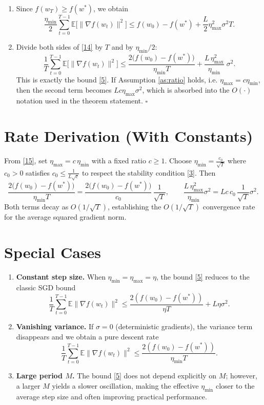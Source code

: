 \documentclass[11pt]{article}
\begin{document}
\begin{enumerate}
\item[Step 9.] Since $f(w_T)\ge f(w^*)$, we obtain
\[
\frac{\eta_{\min}}{2}\sum_{t=0}^{T-1}\mathbb{E}\big[\|\nabla f(w_t)\|^{2}\big]
\le
f(w_0)-f(w^*) + \frac{L}{2}\eta_{\max}^{2}\sigma^{2}T .
\tag{14}
\]

\item[Step 10.] %
Divide both sides of \eqref{14} by $T$ and by $\eta_{\min}/2$:
\[
\frac1T\sum_{t=0}^{T-1}\mathbb{E}\big[\|\nabla f(w_t)\|^{2}\big]
\le
\frac{2\big(f(w_0)-f(w^*)\big)}{\eta_{\min}T}
+ \frac{L\,\eta_{\max}^{2}}{\eta_{\min}}\;\sigma^{2}.
\tag{15}
\]
This is exactly the bound \eqref{5}.  
If Assumption \ref{as:ratio} holds, i.e. $\eta_{\max}=c\eta_{\min}$, then the second term becomes $L c\eta_{\max}\sigma^{2}$, which is absorbed into the $O(\cdot)$ notation used in the theorem statement. \hfill $\square$
\end{enumerate}

\section*{Rate Derivation (With Constants)}
From \eqref{15}, set $\eta_{\max}=c\,\eta_{\min}$ with a fixed ratio $c\ge1$.
Choose $\eta_{\min}= \frac{c_0}{\sqrt{T}}$ where $c_0>0$ satisfies $c_0\le \frac{1}{L\sqrt{c}}$ to respect the stability condition \eqref{3}.
Then
\[
\frac{2\big(f(w_0)-f(w^*)\big)}{\eta_{\min}T}
= \frac{2\big(f(w_0)-f(w^*)\big)}{c_0}\,\frac{1}{\sqrt{T}},
\qquad
\frac{L\,\eta_{\max}^{2}}{\eta_{\min}}\sigma^{2}
= Lc\,c_0\,\frac{1}{\sqrt{T}}\sigma^{2}.
\]
Both terms decay as $O(1/\sqrt{T})$, establishing the $O(1/\sqrt{T})$ convergence rate for the average squared gradient norm.

\section*{Special Cases}
\begin{enumerate}[label=\arabic*.]
\item \textbf{Constant step size.} When $\eta_{\min}=\eta_{\max}=\eta$, the bound \eqref{5} reduces to the classic SGD bound
\[
\frac1T\sum_{t=0}^{T-1}\mathbb{E}\|\nabla f(w_t)\|^{2}
\le \frac{2(f(w_0)-f(w^*))}{\eta T}+L\eta\sigma^{2}.
\]

\item \textbf{Vanishing variance.} If $\sigma=0$ (deterministic gradients), the variance term disappears and we obtain a pure descent rate
\[
\frac1T\sum_{t=0}^{T-1}\mathbb{E}\|\nabla f(w_t)\|^{2}
\le \frac{2(f(w_0)-f(w^*))}{\eta_{\min}T}.
\]

\item \textbf{Large period $M$.} The bound \eqref{5} does not depend explicitly on $M$; however, a larger $M$ yields a slower oscillation, making the effective $\eta_{\min}$ closer to the average step size and often improving practical performance.
\end{enumerate}
\end{document}
